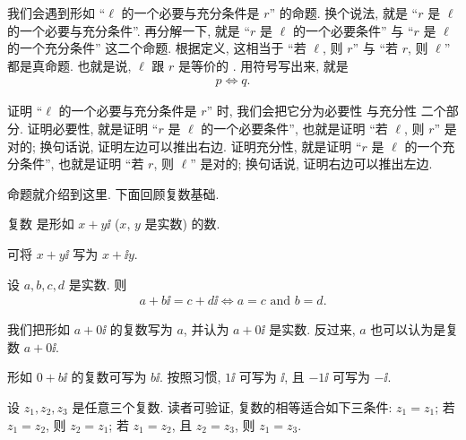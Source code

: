 \begin{remark}
    我们会遇到形如 ``$\ell$ 的一个必要与充分条件是 $r$'' 的命题. 换个说法, 就是 ``$r$ 是 $\ell$ 的一个必要与充分条件''. 再分解一下, 就是 ``$r$ 是 $\ell$ 的一个必要条件'' 与 ``$r$ 是 $\ell$ 的一个充分条件'' 这二个命题. 根据定义, 这相当于 ``若 $\ell$, 则 $r$'' 与 ``若 $r$, 则 $\ell$'' 都是真命题. 也就是说, $\ell$ 跟 $r$ 是等价的 . 用符号写出来, 就是
    \begin{align*}
        p \Leftrightarrow q.
    \end{align*}

    证明 ``$\ell$ 的一个必要与充分条件是 $r$'' 时, 我们会把它分为必要性  与充分性  二个部分. 证明必要性, 就是证明 ``$r$ 是 $\ell$ 的一个必要条件'', 也就是证明 ``若 $\ell$, 则 $r$'' 是对的; 换句话说, 证明左边可以推出右边. 证明充分性, 就是证明 ``$r$ 是 $\ell$ 的一个充分条件'', 也就是证明 ``若 $r$, 则 $\ell$'' 是对的; 换句话说, 证明右边可以推出左边.
\end{remark}

命题就介绍到这里. 下面回顾复数基础.

\begin{definition}
    复数  是形如 $x + y \ii$ ($x$, $y$ 是实数) 的数.
\end{definition}

\begin{remark}
    可将 $x + y \ii$ 写为 $x + \ii y$.
\end{remark}

\begin{definition}
    设 $a,b,c,d$ 是实数. 则
    \begin{align*}
        a + b \ii = c + d \ii \iff a = c \text{ and } b = d.
    \end{align*}
\end{definition}

\begin{remark}
    我们把形如 $a+0 \ii$ 的复数写为 $a$, 并认为 $a+0 \ii$ 是实数. 反过来, $a$ 也可以认为是复数 $a + 0 \ii$.

    形如 $0 + b \ii$ 的复数可写为 $b \ii$. 按照习惯, $1\ii$ 可写为 $\ii$, 且 $-1\ii$ 可写为 $-\ii$.

    设 $z_1, z_2, z_3$ 是任意三个复数. 读者可验证, 复数的相等适合如下三条件: $z_1 = z_1$; 若 $z_1 = z_2$, 则 $z_2 = z_1$; 若 $z_1 = z_2$, 且 $z_2 = z_3$, 则 $z_1 = z_3$.
\end{remark}

